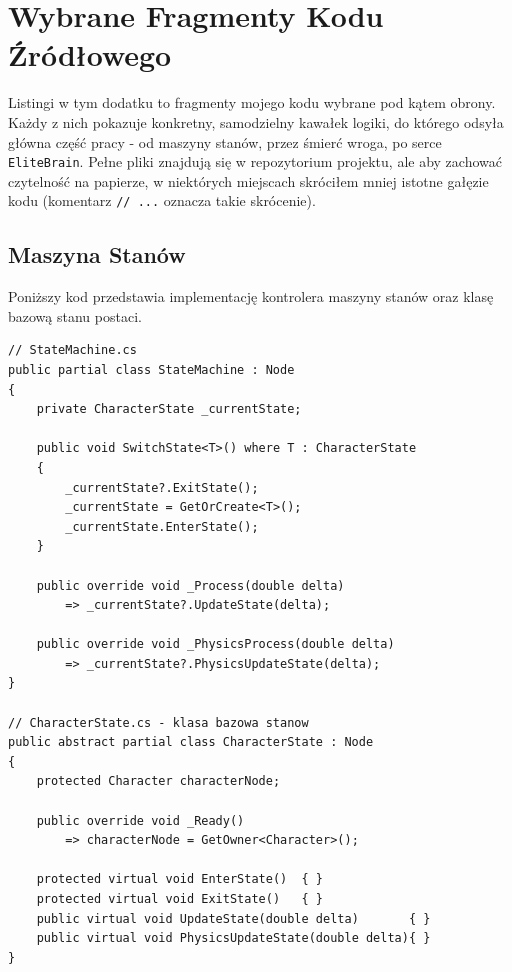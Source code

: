 \chapter{Wybrane Fragmenty Kodu Źródłowego}
\label{ch:Appendix-Code}

Listingi w tym dodatku to fragmenty mojego kodu wybrane pod kątem obrony. Każdy z nich pokazuje konkretny, samodzielny kawałek logiki, do którego odsyła główna część pracy - od maszyny stanów, przez śmierć wroga, po serce \texttt{EliteBrain}. Pełne pliki znajdują się w repozytorium projektu, ale aby zachować czytelność na papierze, w niektórych miejscach skróciłem mniej istotne gałęzie kodu (komentarz \texttt{// ...} oznacza takie skrócenie).

\section{Maszyna Stanów}

Poniższy kod przedstawia implementację kontrolera maszyny stanów oraz klasę bazową stanu postaci.

\begin{lstlisting}[caption={StateMachine.cs oraz CharacterState.cs},label={lst:sm}]
// StateMachine.cs
public partial class StateMachine : Node
{
    private CharacterState _currentState;

    public void SwitchState<T>() where T : CharacterState
    {
        _currentState?.ExitState();
        _currentState = GetOrCreate<T>();
        _currentState.EnterState();
    }

    public override void _Process(double delta)
        => _currentState?.UpdateState(delta);

    public override void _PhysicsProcess(double delta)
        => _currentState?.PhysicsUpdateState(delta);
}

// CharacterState.cs - klasa bazowa stanow
public abstract partial class CharacterState : Node
{
    protected Character characterNode;

    public override void _Ready()
        => characterNode = GetOwner<Character>();

    protected virtual void EnterState()  { }
    protected virtual void ExitState()   { }
    public virtual void UpdateState(double delta)       { }
    public virtual void PhysicsUpdateState(double delta){ }
}
\end{lstlisting}

